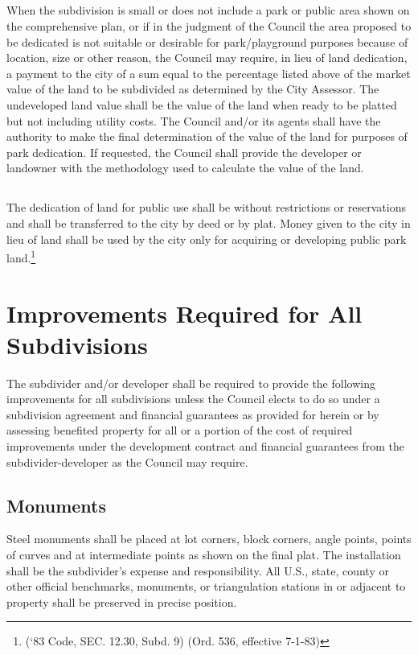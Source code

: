 \subsection{}
When the subdivision is small or does not include a park or public area shown on the comprehensive plan, or if in the judgment of the Council the area proposed to be dedicated is not suitable or desirable for park/playground purposes because of location, size or other reason, the Council may require, in lieu of land dedication, a payment to the city of a sum equal to the percentage listed above of the market value of the land to be subdivided as determined by the City Assessor. The undeveloped land value shall be the value of the land when ready to be platted but not including utility costs. The Council and/or its agents shall have the authority to make the final determination of the value of the land for purposes of park dedication. If requested, the Council shall provide the developer or landowner with the methodology used to calculate the value of the land.
\subsection{}
The dedication of land for public use shall be without restrictions or reservations and shall be transferred to the city by deed or by plat. Money given to the city in lieu of land shall be used by the city only for acquiring or developing public park land.\footnote{(‘83 Code, SEC. 12.30, Subd. 9)  (Ord. 536, effective 7-1-83)}



\setcounter{section}{49}
\section{Improvements Required for All Subdivisions}
The subdivider and/or developer shall be required to provide the following improvements for all subdivisions unless the Council elects to do so under a subdivision agreement and financial guarantees as provided for herein or by assessing benefited property for all or a portion of the cost of required improvements under the development contract and financial guarantees from the subdivider-developer as the Council may require.
\subsection{Monuments}
Steel monuments shall be placed at lot corners, block corners, angle points, points of curves and at intermediate points as shown on the final plat. The installation shall be the subdivider’s expense and responsibility. All U.S., state, county or other official benchmarks, monuments, or triangulation stations in or adjacent to property shall be preserved in precise position.
